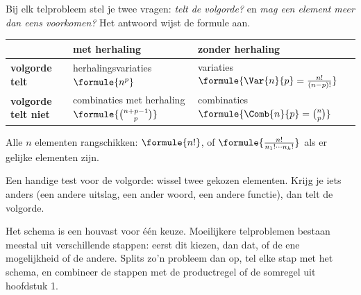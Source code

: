 Bij elk telprobleem stel je twee vragen: \textit{telt de volgorde?} en \textit{mag een element meer dan eens voorkomen?} Het antwoord wijst de formule aan.

\begin{theorie}
{\centering{}\renewcommand{\arraystretch}{1.9}%
\begin{tabular}{|>{\centering\arraybackslash}m{3.2cm}|>{\centering\arraybackslash}m{4.9cm}|>{\centering\arraybackslash}m{4.9cm}|}
\hline
 & \textbf{met herhaling} & \textbf{zonder herhaling} \\ \hline
\textbf{volgorde telt} & herhalingsvariaties \quad $\formule{n^p}$ & variaties \quad $\formule{\Var{n}{p} = \frac{n!}{(n - p)!}}$ \\ \hline
\textbf{volgorde telt niet} & combinaties met herhaling \quad $\formule{\binom{n + p - 1}{p}}$ & combinaties \quad $\formule{\Comb{n}{p} = \binom{n}{p}}$ \\ \hline
\end{tabular}\par}

\vspace{1mm}
Alle $n$ elementen rangschikken: $\formule{n!}$, of $\formule{\frac{n!}{n_1! \cdots n_k!}}$ als er gelijke elementen zijn.
\end{theorie}

Een handige test voor de volgorde: wissel twee gekozen elementen. Krijg je iets anders (een andere uitslag, een ander woord, een andere functie), dan telt de volgorde.

Het schema is een houvast voor één keuze. Moeilijkere telproblemen bestaan meestal uit verschillende stappen: eerst dit kiezen, dan dat, of de ene mogelijkheid of de andere. Splits zo'n probleem dan op, tel elke stap met het schema, en combineer de stappen met de productregel of de somregel uit hoofdstuk 1.


